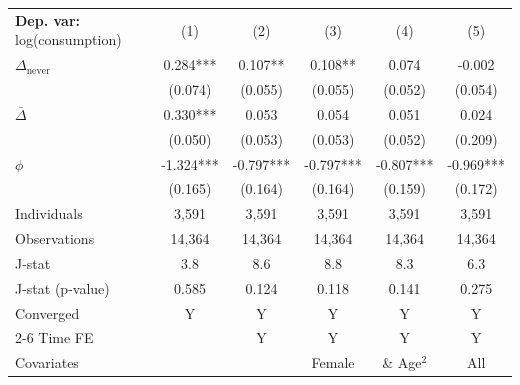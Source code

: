 \begin{tabular}{l ccccc} \toprule  \textbf{Dep. var:}  log(consumption) 
                    &\multicolumn{1}{c}{(1)}   &\multicolumn{1}{c}{(2)}   &\multicolumn{1}{c}{(3)}   &\multicolumn{1}{c}{(4)}   &\multicolumn{1}{c}{(5)}   \\

\addlinespace
$\Delta_{\text{never}}$&       0.284***&       0.107** &       0.108** &       0.074   &      -0.002   \\
                    &     (0.074)   &     (0.055)   &     (0.055)   &     (0.052)   &     (0.054)   \\

\addlinespace
$\bar{\Delta}$      &       0.330***&       0.053   &       0.054   &       0.051   &       0.024   \\
                    &     (0.050)   &     (0.053)   &     (0.053)   &     (0.052)   &     (0.209)   \\

\addlinespace
$\phi$              &      -1.324***&      -0.797***&      -0.797***&      -0.807***&      -0.969***\\
                    &     (0.165)   &     (0.164)   &     (0.164)   &     (0.159)   &     (0.172)   \\
\addlinespace
Individuals         &       3,591   &       3,591   &       3,591   &       3,591   &       3,591   \\
Observations        &      14,364   &      14,364   &      14,364   &      14,364   &      14,364   \\
J-stat              &         3.8   &         8.6   &         8.8   &         8.3   &         6.3   \\
J-stat (p-value)    &       0.585   &       0.124   &       0.118   &       0.141   &       0.275   \\
Converged           &           Y   &           Y   &           Y   &           Y   &           Y   \\
\cmidrule{2-6} Time FE & & Y & Y & Y & Y \\ Covariates & & & Female & \& Age$^2$ & All \\ \bottomrule \end{tabular}
